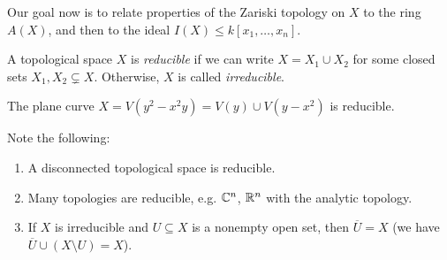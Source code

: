 \begin{remark}
  Our goal now is to relate properties
  of the Zariski topology on $X$ to the
  ring $A(X)$,
  and then to the ideal $I(X) \le k[x_1, \dots, x_n]$.
\end{remark}

\begin{definition}
  A topological space $X$ is \emph{reducible}
  if we can write $X = X_1 \cup X_2$
  for some closed sets $X_1, X_2 \subsetneq X$.
  Otherwise, $X$ is called \emph{irreducible}.
\end{definition}

\begin{example}
  The plane curve
  $X = V(y^2 - x^2y) = V(y) \cup V(y - x^2)$
  is reducible.
\end{example}

\begin{remark}
  Note the following:
  \begin{enumerate}
    \item A disconnected topological space
      is reducible.
    \item Many topologies are reducible,
      e.g. $\mathbb{C}^n$, $\mathbb{R}^n$ with the analytic
      topology.
    \item If $X$ is irreducible and
      $U \subseteq X$ is a nonempty open
      set, then $\overline{U} = X$ (we have
      $\overline{U} \cup (X \setminus U) = X$).
  \end{enumerate}
\end{remark}

